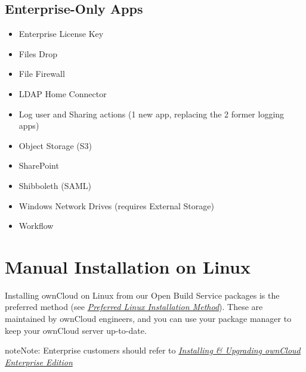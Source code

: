 \documentclass[letterpaper,10pt,english]{sphinxmanual}
\begin{document}
\subsection{Enterprise-Only Apps}
\label{installation/apps_supported:enterprise-only-apps}\begin{itemize}
\item {} 
Enterprise License Key

\item {} 
Files Drop

\item {} 
File Firewall

\item {} 
LDAP Home Connector

\item {} 
Log user and Sharing actions (1 new app, replacing the 2 former logging apps)

\item {} 
Object Storage (S3)

\item {} 
SharePoint

\item {} 
Shibboleth (SAML)

\item {} 
Windows Network Drives (requires External Storage)

\item {} 
Workflow

\end{itemize}


\section{Manual Installation on Linux}
\label{installation/source_installation::doc}\label{installation/source_installation:manual-installation-on-linux}
Installing ownCloud on Linux from our Open Build Service packages is the
preferred method (see {\hyperref[installation/linux_installation::doc]{\emph{\emph{Preferred Linux Installation Method}}}}). These are maintained by
ownCloud engineers, and you can use your package manager to keep your ownCloud
server up-to-date.

\begin{notice}{note}{Note:}
Enterprise customers should refer to
{\hyperref[enterprise_installation/linux_installation::doc]{\emph{\emph{Installing \& Upgrading ownCloud Enterprise Edition}}}}
\end{notice}
\end{document}
